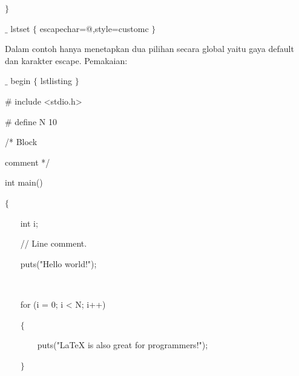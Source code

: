 {\fontsize{10pt}{10pt}\selectfont  $ \} $ }\par

{\fontsize{10pt}{10pt}\selectfont  $ \_ $ lstset $ \{ $ escapechar=@,style=customc $ \} $ }\par

\vspace{12pt}
\hspace{0.50in} Dalam contoh hanya menetapkan dua pilihan secara global yaitu gaya default dan karakter escape. Pemakaian:\par

{\fontsize{10pt}{10pt}\selectfont  $ \_ $ begin $ \{ $ lstlisting $ \} $ }\par

{\fontsize{10pt}{10pt}\selectfont  $\#$ include <stdio.h>}\par

{\fontsize{10pt}{10pt}\selectfont  $\#$ define N 10}\par

{\fontsize{10pt}{10pt}\selectfont /* Block}\par

{\fontsize{10pt}{10pt}\selectfont  * comment */}\par

{\fontsize{10pt}{10pt}\selectfont int main()}\par

{\fontsize{10pt}{10pt}\selectfont  $ \{ $ }\par

{\fontsize{10pt}{10pt}\selectfont ~~~ int i;}\par

{\fontsize{10pt}{10pt}\selectfont ~~~ // Line comment.}\par

{\fontsize{10pt}{10pt}\selectfont ~~~ puts("Hello world!");}\par

{\fontsize{10pt}{10pt}\selectfont ~~~ }\par

{\fontsize{10pt}{10pt}\selectfont ~~~ for (i = 0; i < N; i++)}\par

{\fontsize{10pt}{10pt}\selectfont ~~~  $ \{ $ }\par

{\fontsize{10pt}{10pt}\selectfont ~~~~~~~ puts("LaTeX is also great for programmers!");}\par

{\fontsize{10pt}{10pt}\selectfont ~~~  $ \} $ }\par

